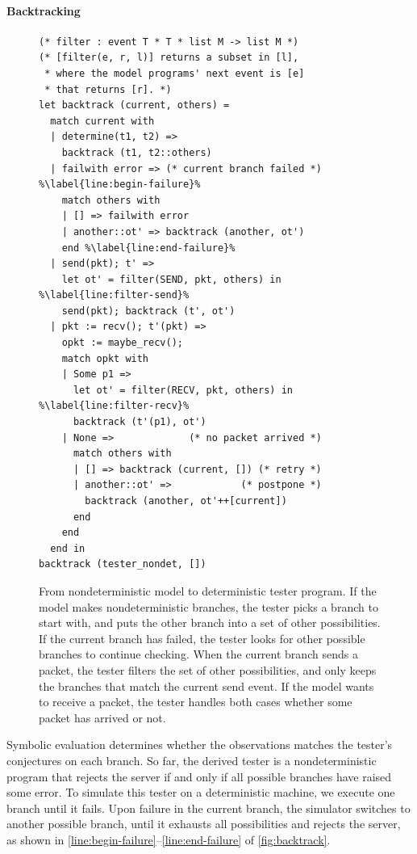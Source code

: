 \paragraph*{Backtracking}

\begin{figure}
  \begin{lstlisting}[style=customcoq,escapechar=\%]
(* filter : event T * T * list M -> list M *)
(* [filter(e, r, l)] returns a subset in [l],
 * where the model programs' next event is [e]
 * that returns [r]. *)
let backtrack (current, others) =
  match current with
  | determine(t1, t2) =>
    backtrack (t1, t2::others)
  | failwith error => (* current branch failed *) %\label{line:begin-failure}%
    match others with
    | [] => failwith error
    | another::ot' => backtrack (another, ot')
    end %\label{line:end-failure}%
  | send(pkt); t' =>
    let ot' = filter(SEND, pkt, others) in %\label{line:filter-send}%
    send(pkt); backtrack (t', ot')
  | pkt := recv(); t'(pkt) =>
    opkt := maybe_recv();
    match opkt with
    | Some p1 =>
      let ot' = filter(RECV, pkt, others) in %\label{line:filter-recv}%
      backtrack (t'(p1), ot')
    | None =>             (* no packet arrived *)
      match others with
      | [] => backtrack (current, []) (* retry *)
      | another::ot' =>            (* postpone *)
        backtrack (another, ot'++[current])
      end
    end
  end in
backtrack (tester_nondet, [])
  \end{lstlisting}
  \caption{From nondeterministic model to deterministic tester program.  If the
    model makes nondeterministic branches, the tester picks a branch to start
    with, and puts the other branch into a set of other possibilities.  If the
    current branch has failed, the tester looks for other possible branches to
    continue checking.  When the current branch sends a packet, the tester
    filters the set of other possibilities, and only keeps the branches that
    match the current send event.  If the model wants to receive a packet, the
    tester handles both cases whether some packet has arrived or not.}
  \label{fig:backtrack}
\end{figure}

Symbolic evaluation determines whether the observations matches the tester's
conjectures on each branch.  So far, the derived tester
is a nondeterministic program that rejects the server if and only if all
possible branches have raised some error.  To simulate this tester on a
deterministic machine, we execute one branch until it fails.  Upon failure in
the current branch, the simulator switches to another possible branch, until it
exhausts all possibilities and rejects the server, as shown in
\autoref{line:begin-failure}--\ref{line:end-failure} of
\autoref{fig:backtrack}.

